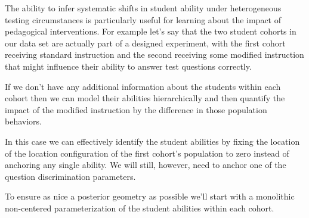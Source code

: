 \documentclass[
  letterpaper,
  DIV=11,
  numbers=noendperiod]{scrartcl}
\begin{document}
The ability to infer systematic shifts in student ability under
heterogeneous testing circumstances is particularly useful for learning
about the impact of pedagogical interventions. For example let's say
that the two student cohorts in our data set are actually part of a
designed experiment, with the first cohort receiving standard
instruction and the second receiving some modified instruction that
might influence their ability to answer test questions correctly.

If we don't have any additional information about the students within
each cohort then we can model their abilities hierarchically and then
quantify the impact of the modified instruction by the difference in
those population behaviors.

In this case we can effectively identify the student abilities by fixing
the location of the location configuration of the first cohort's
population to zero instead of anchoring any single ability. We will
still, however, need to anchor one of the question discrimination
parameters.

To ensure as nice a posterior geometry as possible we'll start with a
monolithic non-centered parameterization of the student abilities within
each cohort.
\end{document}

